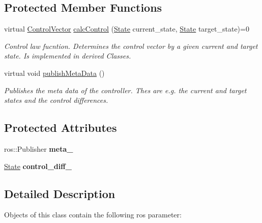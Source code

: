 \subsection*{Protected Member Functions}
\begin{DoxyCompactItemize}
\item 
virtual \hyperlink{structController_1_1ControlVector}{Control\+Vector} \hyperlink{classController_a190a3955517e39310a4b715a883cbe02}{calc\+Control} (\hyperlink{structController_1_1State}{State} current\+\_\+state, \hyperlink{structController_1_1State}{State} target\+\_\+state)=0
\begin{DoxyCompactList}\small\item\em Control law fucntion. Determines the control vector by a given current and target state. Is implemented in derived Classes. \end{DoxyCompactList}\item 
\mbox{\label{classController_a95ac558f7a8d570ba4f0ba12182de8c5}} 
virtual void \hyperlink{classController_a95ac558f7a8d570ba4f0ba12182de8c5}{publish\+Meta\+Data} ()
\begin{DoxyCompactList}\small\item\em Publishes the meta data of the controller. Thes are e.\+g. the current and target states and the control differences. \end{DoxyCompactList}\end{DoxyCompactItemize}
\subsection*{Protected Attributes}
\begin{DoxyCompactItemize}
\item 
\mbox{\label{classController_aeb648bc7d97b36f1dcba956fa5aaeec6}} 
ros\+::\+Publisher {\bfseries meta\+\_\+}
\item 
\mbox{\label{classController_a454701a403066ee2b8c24bd61268655e}} 
\hyperlink{structController_1_1State}{State} {\bfseries control\+\_\+diff\+\_\+}
\end{DoxyCompactItemize}


\subsection{Detailed Description}
Objects of this class contain the following ros parameter\+:

